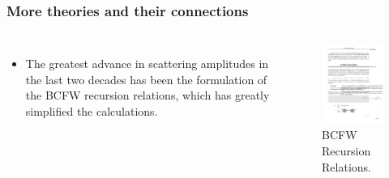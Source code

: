 \documentclass[aspectratio=169]{beamer}%
\begin{document}
 	\begin{frame}
 		\frametitle{More theories and their connections}
 		\begin{columns}
 			\begin{itemize}
 				\setlength{\itemsep}{.3cm}
 				\item{
 					The greatest advance in scattering amplitudes in the last two decades has been the formulation of the BCFW recursion relations, which has greatly simplified the calculations.
 				}
 			\end{itemize}
 			\begin{figure}
 				\centering
 				\includegraphics[width=7cm]{figs/3.pdf}
 				\caption{BCFW Recursion Relations.}
 			\end{figure}
 		\end{columns}
 	\end{frame}
	
\end{document}
